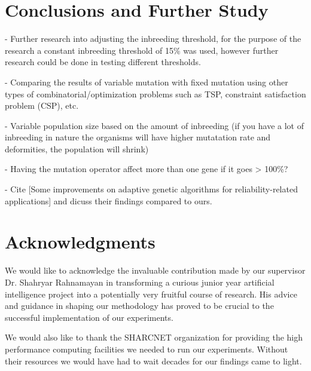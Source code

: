 \documentclass{sig-alternate}
\begin{document}
% 
%
\section{Conclusions and Further Study}

- Further research into adjusting the inbreeding threshold, for the purpose
  of the research a constant inbreeding threshold of 15\% was used, however
  further research could be done in testing different thresholds.

- Comparing the results of variable mutation with fixed mutation using other
  types of combinatorial/optimization problems such as TSP, constraint
  satisfaction problem (CSP), etc.

- Variable population size based on the amount of inbreeding (if you have
  a lot of inbreeding in nature the organisms will have higher mutatation
  rate and deformities, the population will shrink)

- Having the mutation operator affect more than one gene if it goes > 100\%? 

- Cite [Some improvements on adaptive genetic algorithms for reliability-related applications] and dicuss their findings compared to ours.

\begin{flushleft}\end{flushleft}



\section{Acknowledgments}
We would like to acknowledge the invaluable contribution made by our supervisor Dr. Shahryar Rahnamayan in transforming a curious junior year artificial intelligence project into a potentially very fruitful course of research. His advice and guidance in shaping our methodology has proved to be crucial to the successful implementation of our experiments.

We would also like to thank the SHARCNET organization for providing the high performance computing facilities we needed to run our experiments. Without their resources we would have had to wait decades for our findings came to light.
\end{document}
